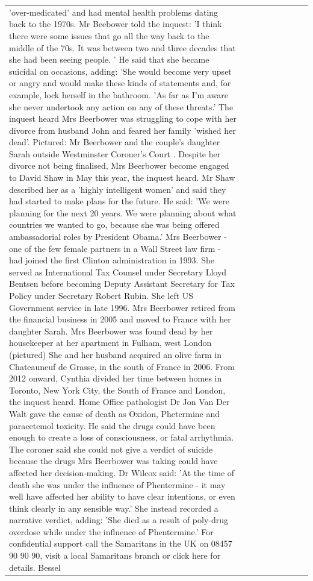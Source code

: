 \begin{table}[H]
\begin{tabular}{lllrlllll}
'over-medicated' and had mental health problems dating back to the 1970s. Mr Beebower told the inquest: 'I think there were some issues that go all the way back to the middle of the 70s. It was between two and three decades that she had been seeing people. ' He said that she became suicidal on occasions, adding: 'She would become very upset or angry and would make these kinds of statements and, for example, lock herself in the bathroom. 'As far as I'm aware she never undertook any action on any of these threats.' The inquest heard Mrs Beerbower was struggling to cope with her divorce from husband John and feared her family 'wished her dead'. Pictured: Mr Beerbower and the couple's daughter Sarah outside Westminster Coroner's Court . Despite her divorce not being finalised, Mrs Beerbower become engaged to David Shaw in May this year, the inquest heard. Mr Shaw described her as a 'highly intelligent women' and said they had started to make plans for the future. He said: 'We were planning for the next 20 years. We were planning about what countries we wanted to go, because she was being offered ambassadorial roles by President Obama.' Mrs Beerbower - one of the few female partners in a Wall Street law firm - had joined the first Clinton administration in 1993. She served as International Tax Counsel under Secretary Lloyd Bentsen before becoming Deputy Assistant Secretary for Tax Policy under Secretary Robert Rubin. She left US Government service in late 1996. Mrs Beerbower retired from the financial business in 2005 and moved to France with her daughter Sarah. Mrs Beerbower was found dead by her housekeeper at her apartment in Fulham, west London (pictured) She and her husband acquired an olive farm in Chateauneuf de Grasse, in the south of France in 2006. From 2012 onward, Cynthia divided her time between homes in Toronto, New York City, the South of France and London, the inquest heard. Home Office pathologist Dr Jon Van Der Walt gave the cause of death as Oxidon, Phetermine and paracetemol toxicity. He said the drugs could have been enough to create a loss of consciousness, or fatal arrhythmia. The coroner said she could not give a verdict of suicide because the drugs Mrs Beerbower was taking could have affected her decision-making. Dr Wilcox said: 'At the time of death she was under the influence of Phentermine - it may well have affected her ability to have clear intentions, or even think clearly in any sensible way.' She instead recorded a narrative verdict, adding: 'She died as a result of poly-drug overdose while under the influence of Phentermine.' For confidential support call the Samaritans in the UK on 08457 90 90 90, visit a local Samaritans branch or click here for details. Bessel \\

\end{tabular}
\end{table}
